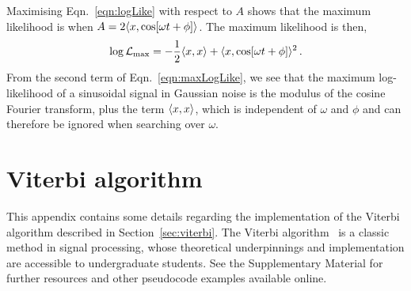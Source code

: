 \documentclass[paper-main.tex]{subfiles}
\begin{document}

Maximising Eqn.~\ref{eqn:logLike} with respect to $A$ shows that the maximum likelihood is when $A = 2\langle x,\cos[\omega t + \phi] \rangle$. 
The maximum likelihood is then, 
\begin{eqnarray}
\label{eqn:maxLogLike}
\log \mathcal{L}_\mathrm{max} = - \frac{1}{2} \langle x,x \rangle + \langle x,\cos[\omega t + \phi] \rangle^2\,. 
\end{eqnarray}
From the second term of Eqn.~\ref{eqn:maxLogLike}, we see that the maximum log-likelihood of a sinusoidal signal in Gaussian noise is the modulus of the cosine Fourier transform, plus the term $\langle x,x \rangle$, which is independent of $\omega$ and $\phi$ and can therefore be ignored when searching over $\omega$.




\section{Viterbi algorithm}
\label{app:viterbi}
This appendix contains some details regarding the implementation of the Viterbi algorithm described in Section~\ref{sec:viterbi}. 
The Viterbi algorithm~\cite{Viterbi:1967} is a classic method in signal processing, whose theoretical underpinnings and implementation are accessible to undergraduate students. 
See the Supplementary Material for further resources and other pseudocode examples available online.
\end{document}
